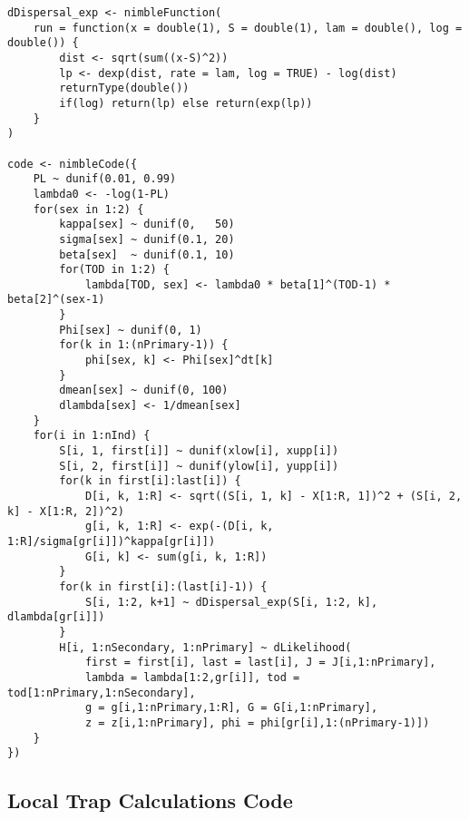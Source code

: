 \begin{singlespace}
\begin{small}
\begin{verbatim}
dDispersal_exp <- nimbleFunction(
    run = function(x = double(1), S = double(1), lam = double(), log = double()) {
        dist <- sqrt(sum((x-S)^2))
        lp <- dexp(dist, rate = lam, log = TRUE) - log(dist)
        returnType(double())
        if(log) return(lp) else return(exp(lp))
    }
)

code <- nimbleCode({
    PL ~ dunif(0.01, 0.99)
    lambda0 <- -log(1-PL)
    for(sex in 1:2) {
        kappa[sex] ~ dunif(0,   50)
        sigma[sex] ~ dunif(0.1, 20)
        beta[sex]  ~ dunif(0.1, 10)
        for(TOD in 1:2) {
            lambda[TOD, sex] <- lambda0 * beta[1]^(TOD-1) * beta[2]^(sex-1)
        }
        Phi[sex] ~ dunif(0, 1)
        for(k in 1:(nPrimary-1)) {
            phi[sex, k] <- Phi[sex]^dt[k]
        }
        dmean[sex] ~ dunif(0, 100)
        dlambda[sex] <- 1/dmean[sex]
    }
    for(i in 1:nInd) {
        S[i, 1, first[i]] ~ dunif(xlow[i], xupp[i])
        S[i, 2, first[i]] ~ dunif(ylow[i], yupp[i])
        for(k in first[i]:last[i]) {
            D[i, k, 1:R] <- sqrt((S[i, 1, k] - X[1:R, 1])^2 + (S[i, 2, k] - X[1:R, 2])^2)
            g[i, k, 1:R] <- exp(-(D[i, k, 1:R]/sigma[gr[i]])^kappa[gr[i]])
            G[i, k] <- sum(g[i, k, 1:R])
        }
        for(k in first[i]:(last[i]-1)) {
            S[i, 1:2, k+1] ~ dDispersal_exp(S[i, 1:2, k], dlambda[gr[i]])
        }
        H[i, 1:nSecondary, 1:nPrimary] ~ dLikelihood(
            first = first[i], last = last[i], J = J[i,1:nPrimary],
            lambda = lambda[1:2,gr[i]], tod = tod[1:nPrimary,1:nSecondary],
            g = g[i,1:nPrimary,1:R], G = G[i,1:nPrimary],
            z = z[i,1:nPrimary], phi = phi[gr[i],1:(nPrimary-1)])
    }
})
\end{verbatim}
\end{small}
\end{singlespace}





\newpage
\subsection{Local Trap Calculations Code}

